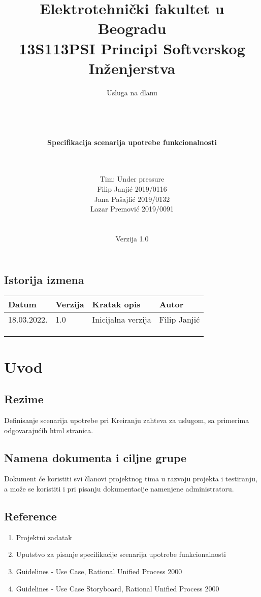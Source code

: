 \documentclass[a4paper,12pt]{report}
\title{\Large Elektrotehnički fakultet u Beogradu \\ 13S113PSI Principi Softverskog Inženjerstva}
\author{\Huge Usluga na dlanu\\ \ \\ \ \\ \ \\ \ \\
	\Large \textbf{Specifikacija scenarija upotrebe funkcionalnosti}\\\Large \textbf{\genitivfunkcionalnosti} \\ \ \\}
\date{\Large   Tim: Under pressure \\ Filip Janjić 2019/0116 \\ Jana Pašajlić 2019/0132 \\ Lazar Premović 2019/0091  \\ \  \\ \  \\
	\large Verzija 1.0}
\newcommand{\dativfunkcionalnosti }{Kreiranju zahteva za uslugom}
\newcommand{\inicijalniautor}{Filip Janjić}
\newcommand{\inicijalnidatum}{18.03.2022.}
\begin{document}
	
	\maketitle
	
	\begin{center}
		\section*{Istorija izmena}
			\begin{tabular}{ |l|l|l|l| }
				\hline
				\textbf{Datum} & \textbf{Verzija} & \textbf{Kratak opis} & \textbf{Autor} \\ 
				\hline
				\inicijalnidatum & 1.0  & Inicijalna verzija & \inicijalniautor \\
				\hline
				&  & &  \\
				\hline
				&  &  &  \\
				\hline
				&  &  &  \\
				\hline
			\end{tabular}
	\end{center}
	
	\newpage
	
	\tableofcontents
	
	\newpage
	
	\section{Uvod}
		\subsection{Rezime}
			Definisanje scenarija upotrebe pri \dativfunkcionalnosti, sa primerima odgovarajućih html stranica.
		\subsection{Namena dokumenta i ciljne grupe}
			Dokument će koristiti svi članovi projektnog tima u razvoju projekta i testiranju, a može se koristiti i pri pisanju dokumentacije namenjene administratoru.
		\subsection{Reference}
			\begin{enumerate}
				\item Projektni zadatak
				\item Uputstvo za pisanje specifikacije scenarija upotrebe funkcionalnosti
				\item Guidelines - Use Case, Rational Unified Process 2000
				\item Guidelines - Use Case Storyboard, Rational Unified Process 2000
			\end{enumerate}
\end{document}

